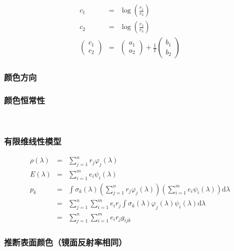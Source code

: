 \documentclass{beamer}
\newcommand{\mathd}{\mathrm{d}}
\newcommand{\nospace}{}
\begin{document}
{{\begin{frame}
  \begin{eqnarray*}
    c_1 & = & \log \left( \frac{r_1}{r_3} \right)\\
    c_2 & = & \log \left( \frac{r_2}{r_3} \right)\\
    \left(\begin{array}{c}
      c_1\\
      c_2
    \end{array}\right) & = & \left(\begin{array}{c}
      a_1\\
      a_2
    \end{array}\right) + \frac{1}{T} \left(\begin{array}{c}
      b_1\\
      b_2
    \end{array}\right)
  \end{eqnarray*}
\end{frame}}{\frametitle{颜色方向}

\quad{}}{\begin{frame}
  \frametitle{颜色恒常性}
  
  \ 
\end{frame}}{\begin{frame}
  \frametitle{有限维线性模型}
  \begin{eqnarray*}
    \rho (\lambda) & = & \sum_{j = 1}^n r_j \varphi_j (\lambda)\\
    E (\lambda) & = & \sum_{i = 1}^m e_i \psi_i (\lambda)\\
    p_k & = & \int \sigma_k (\lambda) \left( \sum_{j = 1}^n r_j \varphi_j
    (\lambda) \right) \left( \sum_{i = 1}^m e_i \psi_i (\lambda) \right)
    \mathd \lambda\\
    & = & \sum_{j = 1}^n \sum_{i = 1}^m e_i r_j \int \sigma_k (\lambda)
    \varphi_j (\lambda) \psi_i (\lambda) \mathd \lambda\\
    & = & \sum_{j = 1}^n \sum_{i = 1}^m e_i r_j g_{i \nospace j \nospace k}
  \end{eqnarray*}
\end{frame}}{\begin{frame}
  \frametitle{推断表面颜色（镜面反射率相同）}
  

\end{frame}}}
\end{document}
